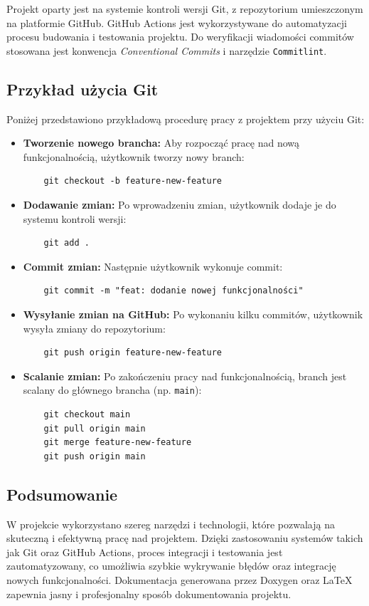 Projekt oparty jest na systemie kontroli wersji Git, z repozytorium umieszczonym na platformie GitHub. GitHub Actions jest wykorzystywane do automatyzacji procesu budowania i testowania projektu. Do weryfikacji wiadomości commitów stosowana jest konwencja \textit{Conventional Commits} i narzędzie \texttt{Commitlint}.

\subsection{Przykład użycia Git}

Poniżej przedstawiono przykładową procedurę pracy z projektem przy użyciu Git:

\begin{itemize}
	\item \textbf{Tworzenie nowego brancha:} Aby rozpocząć pracę nad nową funkcjonalnością, użytkownik tworzy nowy branch:
	      \begin{verbatim}
    git checkout -b feature-new-feature
    \end{verbatim}
	\item \textbf{Dodawanie zmian:} Po wprowadzeniu zmian, użytkownik dodaje je do systemu kontroli wersji:
	      \begin{verbatim}
    git add .
    \end{verbatim}
	\item \textbf{Commit zmian:} Następnie użytkownik wykonuje commit:
	      \begin{verbatim}
    git commit -m "feat: dodanie nowej funkcjonalności"
    \end{verbatim}
	\item \textbf{Wysyłanie zmian na GitHub:} Po wykonaniu kilku commitów, użytkownik wysyła zmiany do repozytorium:
	      \begin{verbatim}
    git push origin feature-new-feature
    \end{verbatim}
	\item \textbf{Scalanie zmian:} Po zakończeniu pracy nad funkcjonalnością, branch jest scalany do głównego brancha (np. \texttt{main}):
	      \begin{verbatim}
    git checkout main
    git pull origin main
    git merge feature-new-feature
    git push origin main
    \end{verbatim}
\end{itemize}

\subsection{Podsumowanie}

W projekcie wykorzystano szereg narzędzi i technologii, które pozwalają na skuteczną i efektywną pracę nad projektem. Dzięki zastosowaniu systemów takich jak Git oraz GitHub Actions, proces integracji i testowania jest zautomatyzowany, co umożliwia szybkie wykrywanie błędów oraz integrację nowych funkcjonalności. Dokumentacja generowana przez Doxygen oraz LaTeX zapewnia jasny i profesjonalny sposób dokumentowania projektu.
